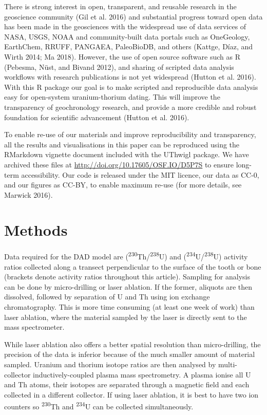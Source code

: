 \documentclass[]{elsarticle} %
\begin{document}
There is strong interest in open, transparent, and reusable research in the geoscience community (Gil et al. 2016) and substantial progress toward open data has been made in the geosciences with the widespread use of data services of NASA, USGS, NOAA and community-built data portals such as OneGeology, EarthChem, RRUFF, PANGAEA, PaleoBioDB, and others (Kattge, Díaz, and Wirth 2014; Ma 2018). However, the use of open source software such as R (Pebesma, Nüst, and Bivand 2012), and sharing of scripted data analysis workflows with research publications is not yet widespread (Hutton et al. 2016). With this R package our goal is to make scripted and reproducible data analysis easy for open-system uranium-thorium dating. This will improve the transparency of geochronology research, and provide a more credible and robust foundation for scientific advancement (Hutton et al. 2016).

To enable re-use of our materials and improve reproducibility and transparency, all the results and visualisations in this paper can be reproduced using the RMarkdown vignette document included with the UThwigl package. We have archived these files at \url{http://doi.org/10.17605/OSF.IO/D5P7S} to ensure long-term accessibility. Our code is released under the MIT licence, our data as CC-0, and our figures as CC-BY, to enable maximum re-use (for more details, see Marwick 2016).

\hypertarget{methods}{%
\section{Methods}\label{methods}}

Data required for the DAD model are (\textsuperscript{230}Th/\textsuperscript{238}U) and (\textsuperscript{234}U/\textsuperscript{238}U) activity ratios collected along a transect perpendicular to the surface of the tooth or bone (brackets denote activity ratios throughout this article). Sampling for analysis can be done by micro-drilling or laser ablation. If the former, aliquots are then dissolved, followed by separation of U and Th using ion exchange chromatography. This is more time consuming (at least one week of work) than laser ablation, where the material sampled by the laser is directly sent to the mass spectrometer.

While laser ablation also offers a better spatial resolution than micro-drilling, the precision of the data is inferior because of the much smaller amount of material sampled. Uranium and thorium isotope ratios are then analysed by multi-collector inductively-coupled plasma mass spectrometry. A plasma ionise all U and Th atoms, their isotopes are separated through a magnetic field and each collected in a different collector. If using laser ablation, it is best to have two ion counters so \textsuperscript{230}Th and \textsuperscript{234}U can be collected simultaneously.
\end{document}
